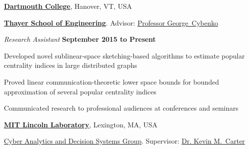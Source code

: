 \documentclass[10pt]{article}
\newcommand{\halfblankline}{\quad\vspace{-0.5\baselineskip}\pagebreak[3]}
\begin{document}
\halfblankline




\href{https://dartmouth.edu}{\textbf{Dartmouth College}},
Hanover, VT, USA

\href{https://engineering.dartmouth.edu/}{\textbf{Thayer School of Engineering}}.
Advisor:               
\href{http://www.dartmouth.edu/~gvc/}
{Professor George~Cybenko}

\begin{outerlist}

\item[] \textit{Research Assistant}%
\hfill \textbf{September 2015 to Present}

\begin{innerlist}

\item Developed novel sublinear-space sketching-based algorithms to estimate popular centrality indices in large distributed graphs 

\item Proved linear communication-theoretic lower space bounds for bounded approximation of several popular centrality indices

\item Communicated research to professional audiences at conferences and seminars

\end{innerlist}
\end{outerlist}






\halfblankline




\href{http://www.ll.mit.edu/}{\textbf{MIT Lincoln Laboratory}},
Lexington, MA, USA

\href{https://www.ll.mit.edu/mission/cybersec/CADS/CADS.html}
{Cyber Analytics and Decision Systems Group}.
Supervisor:
\href{https://www.ll.mit.edu/mission/cybersec/cybersec-bios/carter-bio.html}
{Dr. Kevin M.~Carter}
\end{document}
